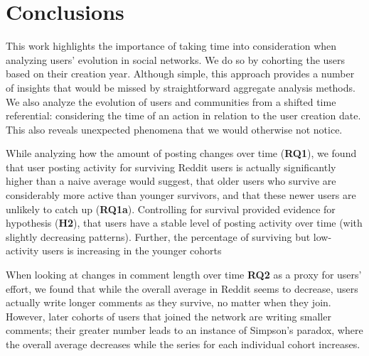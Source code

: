 \section{Conclusions}

This work highlights the importance of taking time into consideration when analyzing users' evolution in social networks. We do so by cohorting the users based on their creation year. Although simple, this approach provides a number of insights that would be missed by straightforward aggregate analysis methods.  We also analyze the evolution of users and communities from a shifted time referential: considering the time of an action in relation to the user creation date. This also reveals unexpected phenomena that we would otherwise not notice.

While analyzing how the amount of posting changes over time (\textbf{RQ1}), we found that user posting activity for surviving Reddit users is actually significantly higher than a naive average would suggest, that older users who survive are considerably more active than younger survivors, and that these newer users are unlikely to catch up (\textbf{RQ1a}).  Controlling for survival provided evidence for hypothesis (\textbf{H2}), that users have a stable level of posting activity over time (with slightly decreasing patterns).  Further, the percentage of surviving but low-activity users is increasing in the younger cohorts 

When looking at changes in comment length over time \textbf{RQ2} as a proxy for users' effort, we found that while the overall average in Reddit seems to decrease, users actually write longer comments as they survive, no matter when they join.  However, later cohorts of users that joined the network are writing smaller comments; their greater number leads to an instance of Simpson's paradox, where the overall average decreases while the series for each individual cohort increases. 

